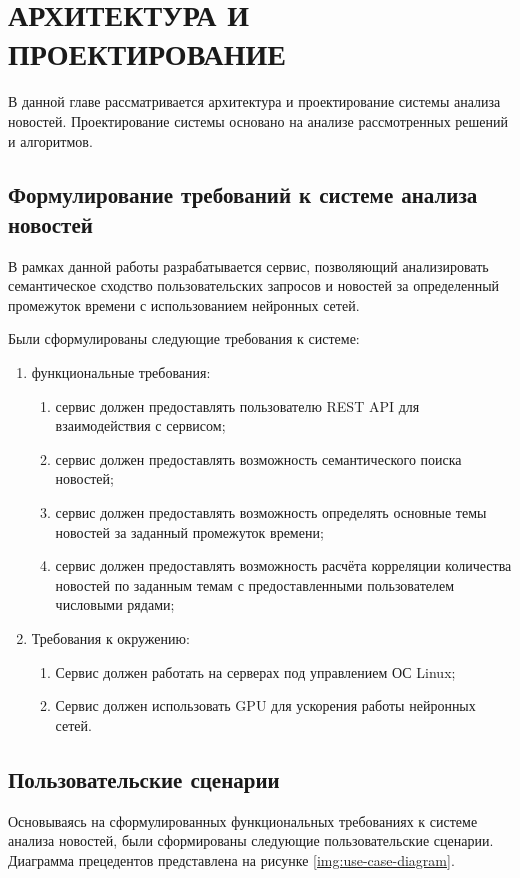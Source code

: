 \chapter{АРХИТЕКТУРА И ПРОЕКТИРОВАНИЕ}

В данной главе рассматривается архитектура и проектирование системы анализа новостей. Проектирование системы основано на анализе рассмотренных решений и алгоритмов.

\section{Формулирование требований к системе анализа новостей}
В рамках данной работы разрабатывается сервис, позволяющий анализировать семантическое сходство пользовательских запросов и новостей за определенный промежуток времени с использованием нейронных сетей.

Были сформулированы следующие требования к системе:

\begin{enumerate}
    \item функциональные требования:
    \begin{enumerate}
        \item сервис должен предоставлять пользователю REST API для взаимодействия с сервисом;
        \item сервис должен предоставлять возможность семантического поиска новостей;
        \item сервис должен предоставлять возможность определять основные темы новостей за заданный промежуток времени;
        \item сервис должен предоставлять возможность расчёта корреляции количества новостей по заданным темам с предоставленными пользователем числовыми рядами;
    \end{enumerate}
    \item Требования к окружению:
    \begin{enumerate}
        \item Сервис должен работать на серверах под управлением ОС Linux;
        \item Сервис должен использовать GPU для ускорения работы нейронных сетей.
    \end{enumerate}
\end{enumerate}

\section{Пользовательские сценарии}
Основываясь на сформулированных функциональных требованиях к системе анализа новостей, были сформированы следующие пользовательские сценарии. Диаграмма прецедентов представлена на рисунке \ref{img:use-case-diagram}.

